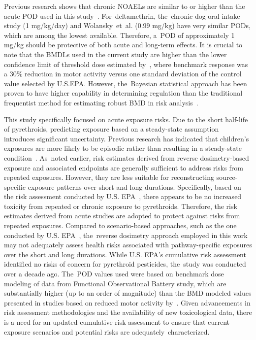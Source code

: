 \documentclass[toxics,article,accept,pdftex,moreauthors]{Definitions/mdpi}
\begin{document}
Previous research shows that chronic NOAELs are similar to or higher than the
acute POD used in this study~\citep{us2017deltamethrin}. For~deltamethrin, the~chronic dog oral intake study (1 mg/kg/day) and Wolansky~et~al.
\citep{wolansky_relative_2006} (0.99 mg/kg) have very similar PODs, which are
among the lowest available. Therefore, a~POD of approximately 1 mg/kg should be
protective of both acute and long-term effects. It is crucial to note that the
BMDLs used in the current study are higher than the lower confidence limit of
threshold dose estimated by~\citep{wolansky_relative_2006}, where benchmark
response was a 30\% reduction in motor activity versus one standard deviation
of the control value selected by U.S.EPA. However, the~Bayesian statistical
approach has been proven to have higher capability in determining regulation
than the traditional frequentist method for estimating robust BMD in risk
analysis~\citep{desai_role_2024}.

This study specifically focused on acute exposure risks. Due to the short
half-life of pyrethroids, predicting exposure based on a steady-state
assumption introduces significant uncertainty. Previous research has indicated
that children's exposures are more likely to be episodic rather than resulting
in a steady-state condition~\citep{kissel_comparison_2005}. As~noted earlier,
risk estimates derived from reverse dosimetry-based exposure and associated
endpoints are generally sufficient to address risks from repeated exposures.
However, they are less suitable for reconstructing source-specific exposure
patterns over short and long durations. Specifically, based on the risk
assessment conducted by U.S. EPA~\citep{us2017cyfluthrin, us2017deltamethrin,
us2017permethrin, us2011pyrethroid, us2018cypermethrin}, there appears to be no
increased toxicity from repeated or chronic exposure to pyrethroids. Therefore,
the risk estimates derived from acute studies are adopted to protect against
risks from repeated exposures. Compared to scenario-based approaches, such as
the one conducted by U.S. EPA~\citep{us2011pyrethroid}, the~reverse dosimetry
approach employed in this work may not adequately assess health risks
associated with pathway-specific exposures over the short and long durations. While 
U.S. EPA's cumulative risk assessment identified no risks of concern for
pyrethroid pesticides, the~study was conducted over a decade ago. The~POD
values used were based on benchmark dose modeling of data from Functional
Observational Battery study, which are substantially higher (up to an order of
magnitude) than the BMD modeled values presented in studies based on reduced
motor activity \mbox{by~\citet{wolansky_relative_2006,
wolansky_marcelo_j_evidence_2009}.} Given advancements in risk assessment
methodologies and the availability of new toxicological data, there is a need
for an updated cumulative risk assessment to ensure that current exposure
scenarios and potential risks are adequately~characterized.
\end{document}
